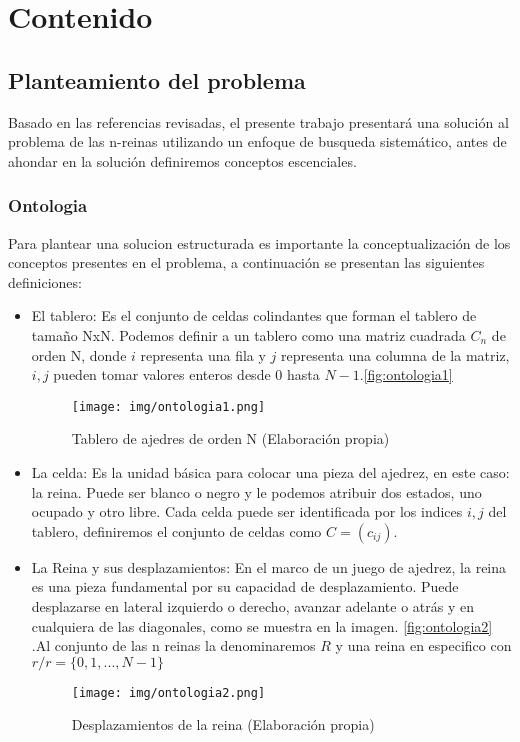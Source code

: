\documentclass[conference]{IEEEtran}
\begin{document}
\section{Contenido}

\subsection{Planteamiento del problema}\label{AA}
Basado en las referencias revisadas, el presente trabajo presentará una solución al problema de las n-reinas utilizando un enfoque de busqueda sistemático, antes de ahondar en la solución definiremos conceptos escenciales.\\
\subsubsection{Ontologia}\label{AA_1}
Para plantear una solucion estructurada es importante la conceptualización de los conceptos presentes en el problema, a continuación se presentan las siguientes definiciones:
\begin{itemize}
\item El tablero: Es el conjunto de celdas colindantes que forman el tablero de tamaño NxN. Podemos definir a un tablero como una matriz cuadrada $C_n$ de orden N, donde $i$ representa una fila y $j$ representa una columna de la matriz, $i,j$ pueden tomar valores enteros desde $0$ hasta $N-1$.\autoref{fig:ontologia1}

\begin{figure}[h]
    \centering
    \texttt{[image: img/ontologia1.png]}
    \caption{Tablero de ajedres de orden N (Elaboración propia)}
    \label{fig:ontologia1}
\end{figure}

\item La celda: Es la unidad básica para colocar una pieza del ajedrez, en este caso: la reina. Puede ser blanco o negro y le podemos atribuir dos estados, uno ocupado y otro libre. Cada celda puede ser identificada por los indices $i, j$ del tablero, definiremos el conjunto de celdas como $C = (c_{ij})$. 

\item La Reina y sus desplazamientos: En el marco de un juego de ajedrez, la reina es una pieza fundamental por su capacidad de desplazamiento. Puede desplazarse en lateral izquierdo o derecho, avanzar adelante o atrás y en cualquiera de las diagonales, como se muestra en la imagen.
\autoref{fig:ontologia2}
.Al conjunto de las n reinas la denominaremos $R$ y una reina en especifico con $r / r=\{0, 1,..., N-1\}$

\begin{figure}[h]
    \centering
    \texttt{[image: img/ontologia2.png]}
    \caption{Desplazamientos de la reina (Elaboración propia)}
    \label{fig:ontologia2}
\end{figure}

\end{itemize}
\end{document}
